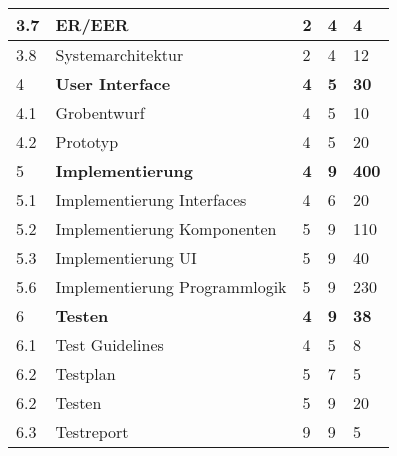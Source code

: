 \begin{tabular}{ | l | p{8cm} | p{2cm}|p{2cm}|p{2cm}|}
\hline
3.7 &ER/EER                            &2 &4 & 4 \\
\hline
3.8 &Systemarchitektur                 &2 &4 & 12 \\
\hline
4 &\textbf{User Interface}                   &\textbf{4} &\textbf{5} & \textbf{30} \\
\hline
4.1 &Grobentwurf                       &4 &5 & 10 \\
\hline
4.2 &Prototyp                          &4 &5 & 20 \\
\hline
5 &\textbf{Implementierung}                 &\textbf{4} &\textbf{9} & \textbf{400} \\
\hline
5.1 &Implementierung Interfaces        &4 &6 & 20 \\
\hline
5.2 &Implementierung Komponenten       &5 &9 & 110 \\
\hline
5.3 &Implementierung UI                &5 &9 & 40 \\
\hline
5.6 &Implementierung Programmlogik     &5 &9 & 230 \\
\hline
6 &\textbf{Testen}                           &\textbf{4} &\textbf{9} & \textbf{38} \\
\hline
6.1 &Test Guidelines                   &4 &5 & 8 \\
\hline
6.2 &Testplan                          &5 &7 & 5 \\
\hline
6.2 &Testen                            &5 &9 & 20 \\
\hline
6.3 &Testreport                        &9 &9 & 5 \\
\hline
\end{tabular}

